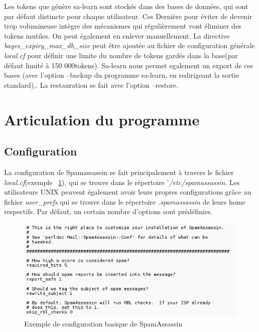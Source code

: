 \documentclass[a4paper,11pt]{article}
\begin{document}
Les tokens que génère sa-learn sont stockés dans des bases de données, qui sont par défaut distincte pour chaque utilisateur. Ces Dernière pour éviter de devenir 
trop volumineuse intègre des mécanismes qui régulièrement vont éliminer des tokens inutiles. On peut également en enlever manuellement.
La directive \emph{bayes\_expiry\_max\_db\_size} peut être ajoutée au fichier de configuration générale 
\emph{local.cf} pour définir une limite du nombre de tokens gardés dans la base(par défaut limité à 150 000tokens).
\linebreak
Sa-learn nous permet egalement un export de ces bases (avec l'option --backup du programme sa-learn, en redirigeant la sortie standard),. La restauration se fait 
avec l'option --restore. 

\pagebreak

\section{Articulation du programme}

\subsection{Configuration}

La configuration de Spamassassin se fait principalement à travers le fichier \emph{local.cf}(exemple ~\ref{fig:local_sample}), qui se trouve dans le 
répertoire '\emph{/etc/spamassassin}.
Les utilisateurs UNIX peuvent également avoir leurs propres configurations grâce au fichier \emph{user\_prefs}
qui se trouve dans le répertoire \emph{.spamassassin} de leurs home respectifs. 
Par défaut, un certain nombre d’options sont prédéfinies. 

\begin{figure}[h]
 \centering
 \includegraphics[width=\textwidth]{./annexes/local_sample.png}
 \caption{Exemple de configuration basique de SpamAssassin}
 \label{fig:local_sample}
\end{figure}
\end{document}
